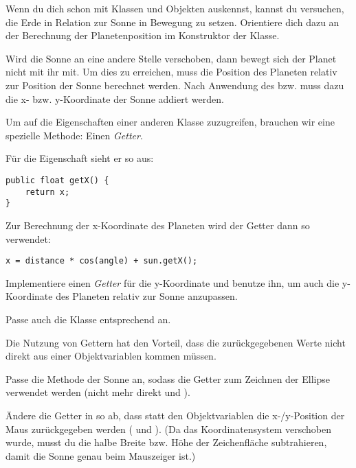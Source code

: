 \documentclass[10pt, a4paper]{arbeitsblatt}
\begin{document}
\begin{aufgabe*}
Wenn du dich schon mit Klassen und Objekten auskennst, kannst du versuchen, die Erde in Relation zur Sonne in Bewegung zu setzen. Orientiere dich dazu an der Berechnung der Planetenposition im Konstruktor der Klasse.
\end{aufgabe*}


\begin{aufgabe}
Wird die Sonne an eine andere Stelle verschoben, dann bewegt sich der Planet nicht mit ihr mit. Um dies zu erreichen, muss die Position des Planeten relativ zur Position der Sonne berechnet werden. Nach Anwendung des  bzw.  muss dazu die x- bzw. y-Koordinate der Sonne addiert werden.

Um auf die Eigenschaften einer anderen Klasse zuzugreifen, brauchen wir eine spezielle Methode: Einen \emph{Getter}.

\begin{multicols}{2}
Für die Eigenschaft  sieht er so aus:
\begin{verbatim}
public float getX() {
	return x;
}
\end{verbatim}

Zur Berechnung der x-Koordinate des Planeten wird der Getter dann so verwendet:
\begin{verbatim}
x = distance * cos(angle) + sun.getX();
\end{verbatim}
\end{multicols}

Implementiere einen \emph{Getter} für die y-Koordinate und benutze ihn, um auch die y-Koordinate des Planeten relativ zur Sonne anzupassen.

Passe auch die Klasse  entsprechend an.
\end{aufgabe}

\begin{aufgabe}
Die Nutzung von Gettern hat den Vorteil, dass die zurückgegebenen Werte nicht direkt aus einer Objektvariablen kommen müssen.

\begin{smallenum}
	\item Passe die  Methode der Sonne an, sodass die Getter zum Zeichnen der Ellipse verwendet werden (nicht mehr direkt  und ).
	\item Ändere die Getter in  so ab, dass statt den Objektvariablen die x-/y-Position der Maus zurückgegeben werden ( und ). (Da das Koordinatensystem verschoben wurde, musst du die halbe Breite bzw. Höhe der Zeichenfläche subtrahieren, damit die Sonne genau beim Mauszeiger ist.)
\end{smallenum}
\end{aufgabe}
\end{document}
